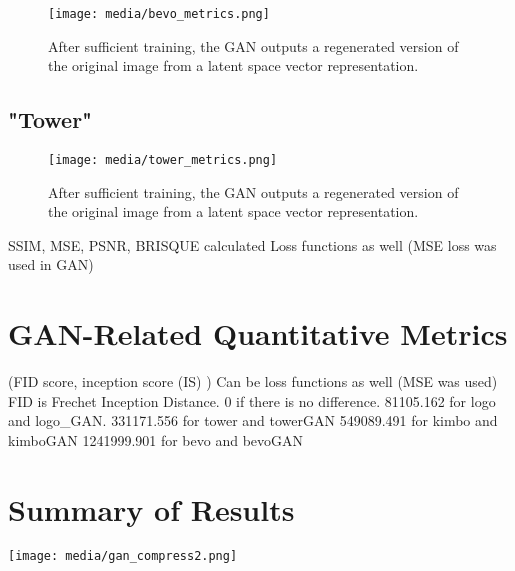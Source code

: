 \begin{figure}[H]
        \begin{center}
        \texttt{[image: media/bevo\_metrics.png]}
        \end{center}
        \caption["Bevo" Established Metrics]{After sufficient training, the GAN outputs a regenerated
        version of the original image from a latent space vector representation.}
        \end{figure}

\subsection{"Tower"}

\begin{figure}[H]
        \begin{center}
        \texttt{[image: media/tower\_metrics.png]}
        \end{center}
        \caption["Tower" Established Metrics]{After sufficient training, the GAN outputs a regenerated
        version of the original image from a latent space vector representation.}
        \end{figure}

SSIM, MSE, PSNR, BRISQUE calculated
Loss functions as well (MSE loss was used in GAN)


\section{GAN-Related Quantitative Metrics}


(FID score, inception score (IS) )
Can be loss functions as well (MSE was used)
FID is Frechet Inception Distance. 0 if there is no difference.
81105.162 for logo and logo\_GAN.
331171.556 for tower and towerGAN
549089.491 for kimbo and kimboGAN
1241999.901 for bevo and bevoGAN


\section{Summary of Results}

\begin{center}
	\texttt{[image: media/gan\_compress2.png]}
\end{center}

